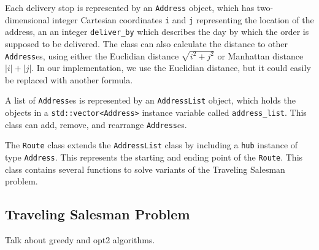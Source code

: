 \documentclass[letterpaper]{article}
\begin{document}
    Each delivery stop is represented by an \verb|Address| object, which has two-dimensional integer Cartesian coordinates \verb|i| and \verb|j| representing the location of the address, an an integer \verb|deliver_by| which describes the day by which the order is supposed to be delivered. The class can also calculate the distance to other \verb|Address|es, using either the Euclidian distance $\sqrt{i^{2} + j^{2}}$ or Manhattan distance $|i| + |j|$. In our implementation, we use the Euclidian distance, but it could easily be replaced with another formula.

    A list of \verb|Address|es is represented by an \verb|AddressList| object, which holds the objects in a \verb|std::vector<Address>| instance variable called \verb|address_list|. This class can add, remove, and rearrange \verb|Address|es.

    The \verb|Route| class extends the \verb|AddressList| class by including a \verb|hub| instance of type \verb|Address|. This represents the starting and ending point of the \verb|Route|. This class contains several functions to solve variants of the Traveling Salesman problem.

    \subsection{Traveling Salesman Problem}
    \label{subsection:Traveling_Salesman_Problem}

    Talk about greedy and opt2 algorithms.
\end{document}
